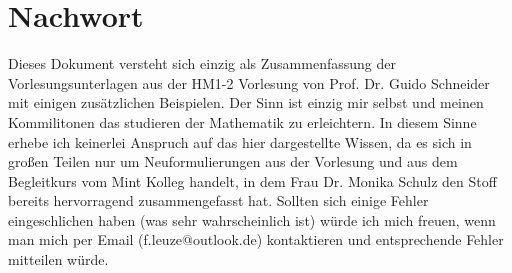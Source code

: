 \section{Nachwort}
Dieses Dokument versteht sich einzig als Zusammenfassung der Vorlesungsunterlagen aus der HM1-2 Vorlesung von Prof. Dr. Guido Schneider mit einigen zusätzlichen Beispielen. Der Sinn ist einzig mir selbst und meinen Kommilitonen das studieren der Mathematik zu erleichtern. In diesem Sinne erhebe ich keinerlei Anspruch auf das hier dargestellte Wissen, da es sich in großen Teilen nur um Neuformulierungen aus der Vorlesung und aus dem Begleitkurs vom Mint Kolleg handelt, in dem Frau Dr. Monika Schulz den Stoff bereits hervorragend zusammengefasst hat. Sollten sich einige Fehler eingeschlichen haben (was sehr wahrscheinlich ist) würde ich mich freuen, wenn man mich per Email (f.leuze@outlook.de) kontaktieren und entsprechende Fehler mitteilen würde.